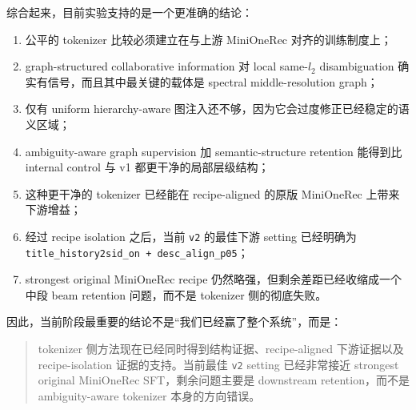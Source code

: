 综合起来，目前实验支持的是一个更准确的结论：
\begin{enumerate}[leftmargin=1.4em]
  \item 公平的 tokenizer 比较必须建立在与上游 MiniOneRec 对齐的训练制度上；
  \item graph-structured collaborative information 对 local same-$l_2$ disambiguation 确实有信号，而且其中最关键的载体是 spectral middle-resolution graph；
  \item 仅有 uniform hierarchy-aware 图注入还不够，因为它会过度修正已经稳定的语义区域；
  \item ambiguity-aware graph supervision 加 semantic-structure retention 能得到比 internal control 与 v1 都更干净的局部层级结构；
  \item 这种更干净的 tokenizer 已经能在 recipe-aligned 的原版 MiniOneRec 上带来下游增益；
  \item 经过 recipe isolation 之后，当前 \texttt{v2} 的最佳下游 setting 已经明确为 \texttt{title\_history2sid\_on + desc\_align\_p05}；
  \item strongest original MiniOneRec recipe 仍然略强，但剩余差距已经收缩成一个中段 beam retention 问题，而不是 tokenizer 侧的彻底失败。
\end{enumerate}

因此，当前阶段最重要的结论不是“我们已经赢了整个系统”，而是：
\begin{quote}
tokenizer 侧方法现在已经同时得到结构证据、recipe-aligned 下游证据以及 recipe-isolation 证据的支持。当前最佳 \texttt{v2} setting 已经非常接近 strongest original MiniOneRec SFT，剩余问题主要是 downstream retention，而不是 ambiguity-aware tokenizer 本身的方向错误。
\end{quote}
